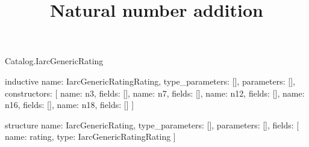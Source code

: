 \begin{lexlean}{Catalog.IarcGenericRating}
\title{Natural number addition}
\begin{semanticmodule}
inductive{
  name: IarcGenericRatingRating,
  type_parameters: [],
  parameters: [],
  constructors: [
    {name: n3, fields: []},
    {name: n7, fields: []},
    {name: n12, fields: []},
    {name: n16, fields: []},
    {name: n18, fields: []}
  ]
}

structure{
  name: IarcGenericRating,
  type_parameters: [],
  parameters: [],
  fields: [
    {name: rating, type: IarcGenericRatingRating}
  ]
}
\end{semanticmodule}
\end{lexlean}
